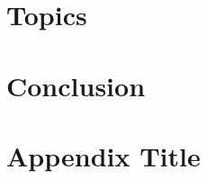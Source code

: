 \documentclass[12pt,lot, lof]{outhesis}
\newcommand{\statusred}{}%
\DeclareRobustCommand{\statusred}{%
      \textcolor{red}{\XSolidBold}
    }
\newcommand{\statusred}{}%
\DeclareRobustCommand{\statusred}{}
\begin{document}
\chapter{\statusred Topics}


\chapter{\statusred Conclusion}



% 


\printglossary[type=\acronymtype]
\printglossary

\appendix
\chapter{Appendix Title}

\end{document}
